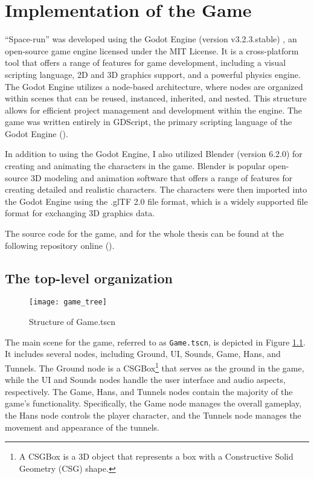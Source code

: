 \chapter{Implementation of the Game}
``Space-run'' was developed using the Godot Engine (version v3.2.3.stable) , an open-source game engine licensed under the MIT License. It is a cross-platform tool that offers a range of features for game development, including a visual scripting language, 2D and 3D graphics support, and a powerful physics engine. The Godot Engine utilizes a node-based architecture, where nodes are organized within scenes that can be reused, instanced, inherited, and nested. This structure allows for efficient project management and development within the engine. The game was written entirely in GDScript, the primary scripting language of the Godot Engine (\cite{GodotDocs}).

In addition to using the Godot Engine, I also utilized Blender (version 6.2.0) \cite{blender} for creating and animating the characters in the game. Blender is popular open-source 3D modeling and animation software that offers a range of features for creating detailed and realistic characters. The characters were then imported into the Godot Engine using the .glTF 2.0 \cite{gltf} file format, which is a widely supported file format for exchanging 3D graphics data.

The source code for the game, and for the whole thesis can be found at the following repository online (\cite{spacerunai}).

\section{The top-level organization}
\begin{figure}[h]
    \centering
    \texttt{[image: game\_tree]}
    \caption{Structure of Game.tscn}
    \label{fig:game_tree}
\end{figure}

The main scene for the game, referred to as \texttt{Game.tscn}, is depicted in Figure \ref{fig:game_tree}. It includes several nodes, including Ground, UI, Sounds, Game, Hans, and Tunnels. The Ground node is a CSGBox\footnote{A CSGBox is a 3D object that represents a box with a Constructive Solid Geometry (CSG) shape.} that serves as the ground in the game, while the UI and Sounds nodes handle the user interface and audio aspects, respectively. The Game, Hans, and Tunnels nodes contain the majority of the game's functionality. Specifically, the Game node manages the overall gameplay, the Hans node controls the player character, and the Tunnels node manages the movement and appearance of the tunnels.

